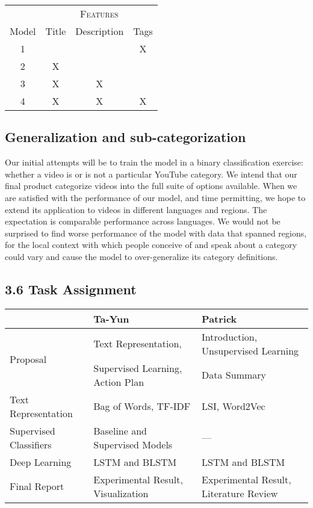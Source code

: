\documentclass[letterpaper, 12pt]{article}
\begin{document}
\begin{table}[H]
  \centering
  \begin{tabular}{cccc}
    \toprule
    & \multicolumn{3}{c}{\textsc{Features}} \\
    \cline{2-4}
    Model & Title & Description & Tags \\
    \midrule
    1 & & & X \\
    2 & X & & \\
    3 & X & X & \\
    4 & X & X & X \\
    \bottomrule
  \end{tabular}
\end{table}

\subsection{Generalization and sub-categorization}

Our initial attempts will be to train the model in a binary classification exercise: whether a video is or is not a particular YouTube category. We intend that our final product categorize videos into the full suite of options available. When we are satisfied with the performance of our model, and time permitting, we hope to extend its application to videos in different languages and regions. The expectation is comparable performance across languages. We would not be surprised to find worse performance of the model with data that spanned regions, for the local context with which people conceive of and speak about a category could vary and cause the model to over-generalize its category definitions.

\subsection*{3.6 Task Assignment}

\begin{table}[H]
  \centering
  \resizebox{\textwidth}{!} {
    \begin{tabular}{lll}
      \toprule
      & Ta-Yun & Patrick \\
      \midrule
      \multirow{2}{*}{Proposal} & Text Representation, & Introduction, Unsupervised Learning \\
      & Supervised Learning, Action Plan & Data Summary \\ [0.5em]
      Text Representation & Bag of Words, TF-IDF &  LSI, Word2Vec \\ [0.5em]
      Supervised Classifiers & Baseline and Supervised Models & --- \\ [0.5em]
      Deep Learning & LSTM and BLSTM & LSTM and BLSTM \\ [0.5em]
      Final Report & Experimental Result, Visualization & Experimental Result, Literature Review \\
      \bottomrule
    \end{tabular}
  }
\end{table}



\end{document}

